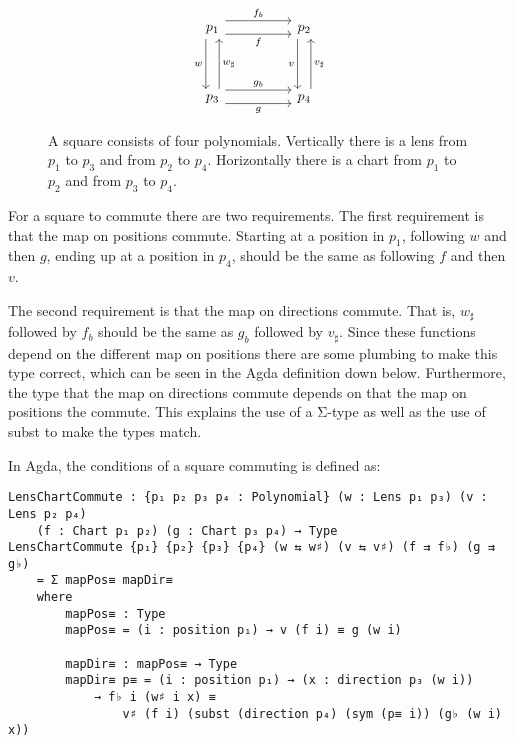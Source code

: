 \begin{figure}[H]
    \centering
\[\begin{tikzcd}
	{p_1} && {p_2} \\
	\\
	{p_3} && {p_4}
	\arrow["g"', shift right=2, from=3-1, to=3-3]
	\arrow["f"', shift right=2, from=1-1, to=1-3]
	\arrow["{w_\sharp}"', shift right=2, from=3-1, to=1-1]
	\arrow["v"', shift right=2, from=1-3, to=3-3]
	\arrow["{v_\sharp}"', shift right=2, from=3-3, to=1-3]
	\arrow["{f_b}", shift left=2, from=1-1, to=1-3]
	\arrow["{g_b}", shift left=2, from=3-1, to=3-3]
	\arrow["w"', shift right=2, from=1-1, to=3-1]
\end{tikzcd}\]
    
    \caption{A square consists of four polynomials. Vertically there is a lens from $p_1$ to $p_3$ and from $p_2$ to $p_4$. Horizontally there is a chart from $p_1$ to $p_2$ and from $p_3$ to $p_4$. }
    \label{fig:commutingSquare}
\end{figure}


For a square to commute there are two requirements. The first requirement is that the map on positions commute. Starting at a position in $p_1$, following $w$ and then $g$, ending up at a position in $p_4$, should be the same as following $f$ and then $v$. 

The second requirement is that the map on directions commute. That is, $w_\sharp$ followed by $f_b$ should be the same as $g_b$ followed by $v_\sharp$. Since these functions depend on the different map on positions there are some plumbing to make this type correct, which can be seen in the Agda definition down below. Furthermore, the type that the map on directions commute depends on that the map on positions the commute. This explains the use of a Σ-type as well as the use of subst to make the types match.

In Agda, the conditions of a square commuting is defined as:
\begin{verbatim}
LensChartCommute : {p₁ p₂ p₃ p₄ : Polynomial} (w : Lens p₁ p₃) (v : Lens p₂ p₄)
    (f : Chart p₁ p₂) (g : Chart p₃ p₄) → Type
LensChartCommute {p₁} {p₂} {p₃} {p₄} (w ⇆ w♯) (v ⇆ v♯) (f ⇉ f♭) (g ⇉ g♭)
    = Σ mapPos≡ mapDir≡
    where
        mapPos≡ : Type
        mapPos≡ = (i : position p₁) → v (f i) ≡ g (w i)

        mapDir≡ : mapPos≡ → Type
        mapDir≡ p≡ = (i : position p₁) → (x : direction p₃ (w i))
            → f♭ i (w♯ i x) ≡ 
                v♯ (f i) (subst (direction p₄) (sym (p≡ i)) (g♭ (w i) x))
\end{verbatim}

